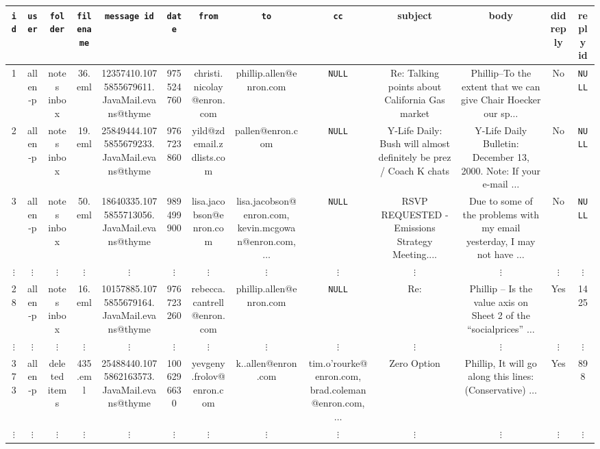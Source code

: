 \documentclass{standalone}
\begin{document}
\begin{tabular}{|c|c|c|c|c|c|c|c|c| c|c|c|c|}
\hline
\texttt{id} & \texttt{user} & \texttt{folder} & \texttt{filename} & \texttt{message id} & \texttt{date} & \texttt{from} & \texttt{to} & \texttt{cc} &
subject & body & did reply & reply id 
\\\hline
1 & allen-p & notes inbox & 36.eml & 12357410.1075855679611.JavaMail.evans@thyme & 975524760 & christi.nicolay@enron.com & phillip.allen@enron.com & \texttt{NULL} & Re: Talking points about California Gas market & Phillip--To the extent that we can give Chair Hoecker our sp$\ldots$ & No & \texttt{NULL}
\\
2 & allen-p & notes inbox & 19.eml & 25849444.1075855679233.JavaMail.evans@thyme & 976723860 & yild@zdemail.zdlists.com & pallen@enron.com & \texttt{NULL} & Y-Life Daily: Bush will almost definitely be prez / Coach K chats & Y-Life Daily Bulletin: December 13, 2000. Note: If your e-mail $\ldots$ & No & \texttt{NULL}
\\
3 & allen-p & notes inbox & 50.eml & 18640335.1075855713056.JavaMail.evans@thyme & 989499900 & lisa.jacobson@enron.com & lisa.jacobson@enron.com, kevin.mcgowan@enron.com, $\ldots$ & \texttt{NULL} & RSVP REQUESTED - Emissions Strategy Meeting.... & Due to some of the problems with my email yesterday, I may not have $\ldots$ & No & \texttt{NULL}
\\
$\vdots$ & $\vdots$ & $\vdots$ & $\vdots$ & $\vdots$ & $\vdots$ & $\vdots$ & $\vdots$ & $\vdots$ & $\vdots$ & $\vdots$ & $\vdots$ & $\vdots$  \\ 
28 & allen-p & notes inbox &16.eml & 10157885.1075855679164.JavaMail.evans@thyme &976723260 & rebecca.cantrell@enron.com & phillip.allen@enron.com & \texttt{NULL} & Re: & Phillip -- Is the value axis on Sheet 2 of the ``socialprices'' $\ldots$ & Yes & 1425
\\
$\vdots$ & $\vdots$ & $\vdots$ & $\vdots$ & $\vdots$ & $\vdots$ & $\vdots$ & $\vdots$ & $\vdots$ & $\vdots$ & $\vdots$ & $\vdots$ & $\vdots$  \\ 
%
373 & allen-p & deleted items & 435.eml & 25488440.1075862163573.JavaMail.evans@thyme &1006296630 & yevgeny.frolov@enron.com & k..allen@enron.com & tim.o'rourke@enron.com, brad.coleman@enron.com, $\ldots$ & Zero Option & Phillip, It will go along this lines: (Conservative) $\ldots$ & Yes & 898
\\
$\vdots$ & $\vdots$ & $\vdots$ & $\vdots$ & $\vdots$ & $\vdots$ & $\vdots$ & $\vdots$ & $\vdots$ & $\vdots$ & $\vdots$ & $\vdots$ & $\vdots$  \\ 

\end{tabular}
\end{document}

